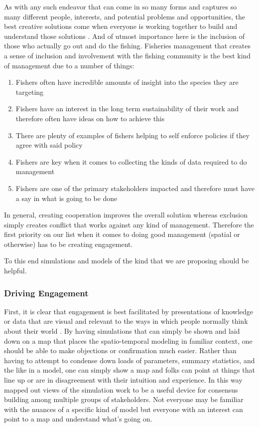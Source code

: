 \documentclass[11pt]{article}
\begin{document}
As with any such endeavor that can come in so many forms and captures so many different people, interests, and potential problems and opportunities, the best creative solutions come when everyone is working together to build and understand those solutions \citep{prince2010} \citep{waltersmartell}. And of utmost importance here is the inclusion of those who actually go out and do the fishing. Fisheries management that creates a sense of inclusion and involvement with the fishing community is the best kind of management due to a number of things:

\begin{enumerate}
\item Fishers often have incredible amounts of insight into the species they are targeting 
\item Fishers have an interest in the long term sustainability of their work and therefore often have ideas on how to achieve this
\item There are plenty of examples of fishers helping to self enforce policies if they agree with said policy
\item Fishers are key when it comes to collecting the kinds of data required to do management
\item Fishers are one of the primary stakeholders impacted and therefore must have a say in what is going to be done
\end{enumerate}

In general, creating cooperation improves the overall solution whereas exclusion simply creates conflict that works against any kind of management. Therefore the first priority on our list when it comes to doing good management (spatial or otherwise) has to be creating engagement. \newline

To this end simulations and models of the kind that we are proposing should be helpful. 

\subsubsection{Driving Engagement}

First, it is clear that engagement is best facilitated by presentations of knowledge or data that are visual and relevant to the ways in which people normally think about their world \citep{prince2010} \citep{lorenzen2010}. By having simulations that can simply be shown and laid down on a map that places the spatio-temporal modeling in familiar context, one should be able to make objections or confirmation much easier. Rather than having to attempt to condense down loads of parameters, summary statistics, and the like in a model, one can simply show a map and folks can point at things that line up or are in disagreement with their intuition and experience. In this way mapped out views of the simulation work to be a useful device for consensus building among multiple groups of stakeholders. Not everyone may be familiar with the nuances of a specific kind of model but everyone with an interest can point to a map and understand what's going on. 
\newline
\end{document}
